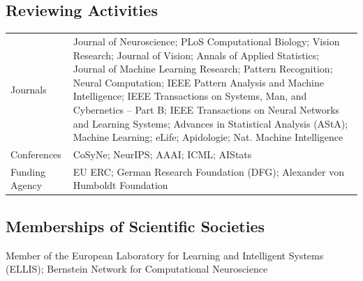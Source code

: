 \documentclass[COG,11pt]{ercgrant}
\begin{document}
\subsection{Reviewing Activities}
\begin{tabular}{p{3cm}p{12cm}}
Journals & Journal of Neuroscience; PLoS Computational Biology; Vision Research; Journal of Vision; Annals of Applied Statistics; Journal of Machine Learning Research; Pattern Recognition; Neural Computation; IEEE Pattern Analysis and Machine Intelligence; IEEE Transactions on Systems, Man, and Cybernetics – Part B; IEEE Transactions on Neural Networks and Learning Systems; Advances in Statistical Analysis (AStA); Machine Learning; eLife; Apidologie; Nat. Machine Intelligence\\
Conferences & CoSyNe; NeurIPS; AAAI; ICML; AIStats\\
Funding Agency & EU ERC; German Research Foundation (DFG); Alexander von Humboldt Foundation\\
\end{tabular}

\subsection{Memberships of Scientific Societies}
Member of the European Laboratory for Learning and Intelligent Systems (ELLIS); Bernstein Network for Computational Neuroscience
\end{document}
